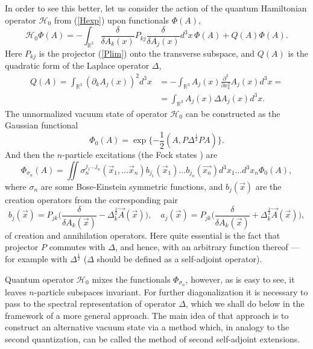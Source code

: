 \documentclass[12pt]{article}
\newcommand{\pl}{\partial}
\newcommand{\HH}{\mathscr{H}}
\newcommand{\RR}{\mathbb{R}}
\begin{document}
	In order to see this better, let us consider the action
	of the quantum Hamiltonian operator
$ \HH_{0} $ from
(\ref{Hexp})
	upon functionals
$ \Phi(A) $,
\begin{equation}
\label{qH0}
    \HH_{0}\Phi(A) = - \int_{\RR^{3}} \frac{\delta}{\delta A_{k}(x)}
	P_{kj} \frac{\delta}{\delta A_{j}(x)} d^{3}x \,\Phi(A)
	+ Q(A) \Phi(A) .
\end{equation}
	Here
$ P_{kj} $
	is the projector
(\ref{Plim})
	onto the transverse subspace, and
$ Q(A) $
	is the quadratic form of the Laplace operator
$ \Delta $,
\begin{align}
\nonumber
    Q(A) = \int_{\RR^{3}} (\pl_{k}A_{j}(x))^{2} d^{3}x
	&= - \int_{\RR^{3}} A_{j}(x) \frac{\pl^{2}}{\pl x_{k}^{2}} A_{j}(x)
	    d^{3} x =\\
\label{QA}
	&= \int_{\RR^{3}} A_{j}(x) \Delta A_{j}(x) d^{3}x .
\end{align}
    The unnormalized vacuum state of operator
$ \HH_{0} $
    can be constructed as the Gaussian functional
\begin{equation}
\label{Phi0}
    \Phi_{0}(A) = \exp\{-\frac{1}{2}(A,P\Delta^{\frac{1}{2}}PA)\} .
\end{equation}
    And then the
$ n $-particle excitations (the Fock states
\cite{Fock})
    are
\begin{equation*}
\label{Phin}
    \Phi_{\sigma_{n}}(A) = \iint
    \sigma_{n}^{j_{1}\ldots j_{n}} (\vec{x}_{1},\ldots \vec{x}_{n})
	b_{j_{1}}(\vec{x}_{1}) \ldots b_{j_{n}}(\vec{x_{n}})
    d^{3}x_{1} \ldots d^{3}x_{n} \Phi_{0}(A) ,
\end{equation*}
	where
$ \sigma_{n} $ are some Bose-Einstein symmetric functions, and
$ b_{j}(\vec{x}) $ are the creation operators from the corresponding pair
\begin{equation*}
    b_{j}(\vec{x}) = P_{jk}\bigl(\frac{\delta}{\delta A_{k}(\vec{x})}
	- \Delta^{\frac{1}{2}}_{k}\vec{A}(\vec{x})\bigr) ,\quad
    a_{j}(\vec{x}) = P_{jk}\bigl(\frac{\delta}{\delta A_{k}(\vec{x})}
	+ \Delta^{\frac{1}{2}}_{k}\vec{A}(\vec{x})\bigr) ,
\end{equation*}
    	of creation and annihilation operators.
	Here quite essential is the fact that projector
$ P $
	commutes with
$ \Delta $,
	and hence, with an arbitrary function thereof ---
	for example with 
$ \Delta^{\frac{1}{2}} $
($ \Delta $ should be defined as a self-adjoint operator).

	Quantum operator
$ \HH_{0} $
	mixes the functionals
$ \Phi_{\sigma_{n}} $,
	however, as is easy to see, 
	it leaves
$ n $-particle subspaces invariant.
	For further diagonalization it is necessary to pass
	to the spectral representation of operator
$ \Delta $,
	which we shall do below in the framework of a more general approach.
	The main idea of that approach is
	to construct an alternative vacuum state via a method
	which, in analogy to the second quantization, can be called
	the method of second self-adjoint extensions.
\end{document}
